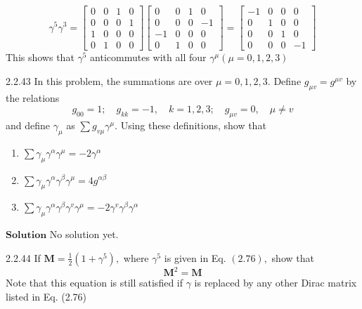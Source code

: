 \documentclass{styles/kaobook}
\begin{document}
$$
\gamma^{5} \gamma^{3}=\begin{bmatrix}
0 & 0 & 1 & 0 \\
0 & 0 & 0 & 1 \\
1 & 0 & 0 & 0 \\
0 & 1 & 0 & 0
\end{bmatrix}\begin{bmatrix}
0 & 0 & 1 & 0 \\
0 & 0 & 0 & -1 \\
-1 & 0 & 0 & 0 \\
0 & 1 & 0 & 0
\end{bmatrix}=\begin{bmatrix}
-1 & 0 & 0 & 0 \\
0 & 1 & 0 & 0 \\
0 & 0 & 1 & 0 \\
0 & 0 & 0 & -1
\end{bmatrix}
$$
This shows that $\gamma^{5}$ anticommutes with all four $\gamma^{\mu}(\mu=0,1,2,3)$




\begin{greenbox}{2.2.43}
In this problem, the summations are over $\mu=0,1,2,3 .$ Define $g_{\mu v}=g^{\mu v}$ by the relations
$$
g_{00}=1 ; \quad g_{k k}=-1, \quad k=1,2,3 ; \quad g_{\mu v}=0, \quad \mu \neq v
$$
and define $\gamma_{\mu}$ as $\sum g_{v \mu} \gamma^{\mu} .$ Using these definitions, show that
\begin{enumerate}[$(a)$]
\item $\sum \gamma_{\mu} \gamma^{\alpha} \gamma^{\mu}=-2 \gamma^{\alpha}$
\item $\sum \gamma_{\mu} \gamma^{\alpha} \gamma^{\beta} \gamma^{\mu}=4 g^{\alpha \beta}$
\item $\sum \gamma_{\mu} \gamma^{\alpha} \gamma^{\beta} \gamma^{v} \gamma^{\mu}=-2 \gamma^{v} \gamma^{\beta} \gamma^{\alpha}$
\end{enumerate}
\end{greenbox}

$\boxed{\textbf{Solution}}$ No solution yet.

\begin{greenbox}{2.2.44}
If $\mathbf{M}=\frac{1}{2}\left(1+\gamma^{5}\right),$ where $\gamma^{5}$ is given in Eq. $(2.76),$ show that
$$
\mathbf{M}^{2}=\mathbf{M}
$$
Note that this equation is still satisfied if $\gamma$ is replaced by any other Dirac matrix listed in Eq. (2.76) 
\end{greenbox}
\end{document}
